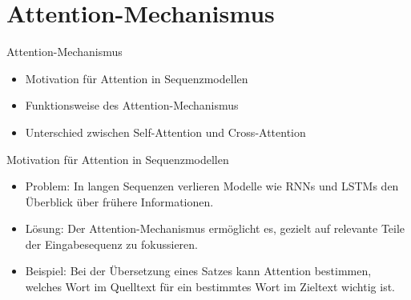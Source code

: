 \documentclass[aspectratio=1610, xcolor=dvipsnames, 9pt]{beamer}
\begin{document}
\section{Attention-Mechanismus}

\begin{frame}{Attention-Mechanismus}
  \begin{itemize}
    \item Motivation für Attention in Sequenzmodellen
    \item Funktionsweise des Attention-Mechanismus
    \item Unterschied zwischen Self-Attention und Cross-Attention
  \end{itemize}
\end{frame}

\begin{frame}{Motivation für Attention in Sequenzmodellen}
  \begin{itemize}
    \item Problem: In langen Sequenzen verlieren Modelle wie RNNs und LSTMs den Überblick über frühere Informationen.
    \item Lösung: Der Attention-Mechanismus ermöglicht es, gezielt auf relevante Teile der Eingabesequenz zu fokussieren.
    \item Beispiel: Bei der Übersetzung eines Satzes kann Attention bestimmen, welches Wort im Quelltext für ein bestimmtes Wort im Zieltext wichtig ist.
  \end{itemize}
\end{frame}
\end{document}
